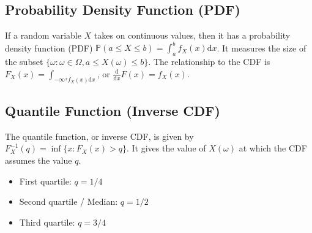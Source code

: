\subsection{Probability Density Function (PDF)}
If a random variable $X$ takes on continuous values, then it has a probability density function (PDF) $\mathbb{P}(a\leq X \leq b) = \int_a^b f_X(x) \mathrm{d}x$. It measures the size of the subset $\{\omega: \omega\in\Omega, a\leq X(\omega) \leq b\}$. The relationship to the CDF is $F_X(x) = \int_{-\infty^x f_X(x) \mathrm{d}x}$, or $\frac{\mathrm{d}}{\mathrm{d}x}F(x) = f_X(x)$. 


\subsection{Quantile Function (Inverse CDF)}
The quantile function, or inverse CDF, is given by $F_X^{-1}(q) = \inf \{ x: F_X(x) > q \}$. It gives the value of $X(\omega)$ at which the CDF assumes the value $q$.

\begin{itemize}
\item First quartile: $q=1/4$
\item Second quartile / Median: $q =1/2$
\item Third quartile: $q=3/4$
\end{itemize}








